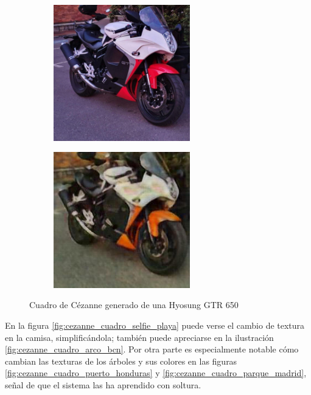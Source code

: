 \documentclass[[../main.tex]{subfiles}
\begin{document}
        \begin{figure}[!htb]
            \begin{subfigure}[b]{0.49\textwidth}
            \includegraphics[width=0.65\textwidth]{imagenes/imagen2cuadro/propias/cezanne/photo_2020-10-23_16-29-18.jpg}
            \end{subfigure}
        \hfill
            \begin{subfigure}[b]{0.49\textwidth}
            \includegraphics[width=0.65\textwidth]{imagenes/imagen2cuadro/propias/cezanne/photo_2020-10-23_16-29-18_2.jpg}
            \end{subfigure}
        \caption{Cuadro de Cézanne generado de una Hyosung GTR 650}
        \label{fig:cezanne_cuadro_moto_aparcada}
        \end{figure}
        
        En la figura \ref{fig:cezanne_cuadro_selfie_playa} puede verse el cambio de textura en la camisa, simplificándola; también puede apreciarse en la ilustración \ref{fig:cezanne_cuadro_arco_bcn}. Por otra parte es especialmente notable cómo cambian las texturas de los árboles y sus colores en las figuras \ref{fig:cezanne_cuadro_puerto_honduras} y \ref{fig:cezanne_cuadro_parque_madrid}, señal de que el sistema las ha aprendido con soltura.
        
\end{document}
